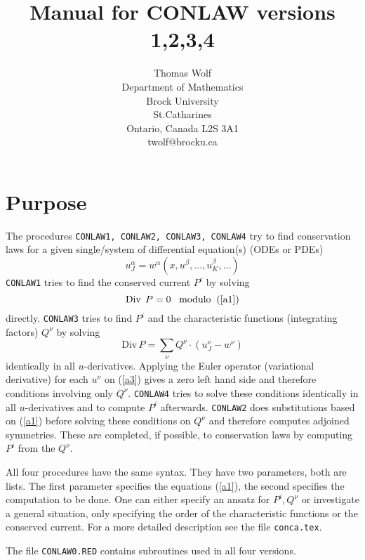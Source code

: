 \documentclass[12pt]{article}
\title{Manual for CONLAW versions 1,2,3,4}
\author{Thomas Wolf \\                        
        Department of Mathematics \\
        Brock University \\
        St.Catharines \\
        Ontario, Canada L2S 3A1 \\
        twolf@brocku.ca}
\begin{document}
\maketitle
\section{Purpose}
The procedures {\tt CONLAW1, CONLAW2, CONLAW3, CONLAW4} 
try to find conservation laws
for a given single/system of differential equation(s) (ODEs or PDEs)
\begin{equation}
     u^{\alpha}_J = w^{\alpha}(x,u^{\beta},...,u^{\beta}_K,...)  \label{a1}
\end{equation}
{\tt CONLAW1} tries to find the conserved current $P^i$ by solving
\begin{equation}
   \mbox{Div}\;\,P = 0  \;\;\; \mbox{modulo}\;\; (\ref{a1})
\label{a2}
\end{equation}
directly. {\tt CONLAW3} tries to find $P^i$ and the characteristic
functions (integrating factors) $Q^{\nu}$ by solving
\begin{equation}
\mbox{Div}\,P = \sum_{\nu} Q^{\nu}\cdot (u^{\nu}_J - w^{\nu}) \label{a3}
\end{equation}
identically in all $u$-derivatives.
Applying the Euler operator (variational derivative) for each $u^{\nu}$
on (\ref{a3}) gives a zero left hand side and therefore
conditions involving only $Q^{\nu}$. {\tt CONLAW4} tries to solve these
conditions identically in all $u$-derivatives and to compute $P^i$
afterwards. {\tt CONLAW2}
does substitutions based on (\ref{a1}) before solving these
conditions on $Q^{\nu}$
and therefore computes adjoined symmetries. These are
completed, if possible, to conservation laws by computing $P^i$ from
the $Q^{\nu}$.

All four procedures have the same syntax. They have two parameters,
both are lists. The first parameter specifies the equations (\ref{a1}), 
the second specifies the computation to be done. One can either specify an 
ansatz for $P^i, Q^{\nu}$ or investigate a general situation, only specifying 
the order of the characteristic functions or the conserved current. For a 
more detailed description see the file {\tt conca.tex}.

The file {\tt CONLAW0.RED} contains subroutines used in all four versions.
\end{document}
